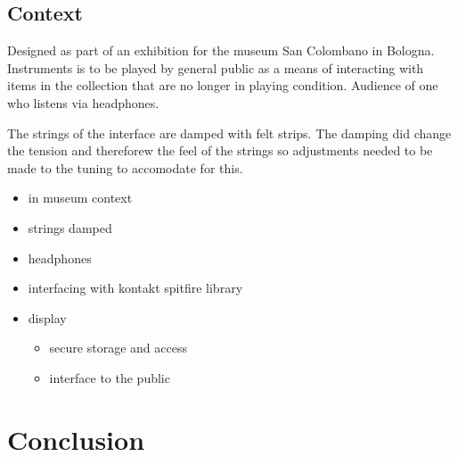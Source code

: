 


\subsection{Context}\label{context}

Designed as part of an exhibition for the museum San Colombano in
Bologna. Instruments is to be played by general public as a means of
interacting with items in the collection that are no longer in playing
condition. Audience of one who listens via headphones.

The strings of the interface are damped with felt strips. The damping
did change the tension and thereforew the feel of the strings so
adjustments needed to be made to the tuning to accomodate for this.

\begin{itemize}
\item
  in museum context
\item
  strings damped
\item
  headphones
\item
  interfacing with kontakt spitfire library
\item
  display

  \begin{itemize}
  \item
    secure storage and access
  \item
    interface to the public
  \end{itemize}
\end{itemize}



\section{Conclusion}\label{conclusion}

